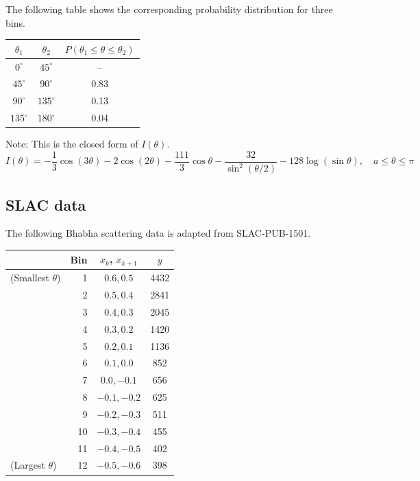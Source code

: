 \documentclass[12pt]{article}
\begin{document}
\noindent
The following table shows the corresponding probability distribution for three bins.

\begin{center}
\begin{tabular}{|c|c|c|}
\hline
$\theta_1$ & $\theta_2$ & $P(\theta_1\le\theta\le\theta_2)$\\
\hline
$0^\circ$ & $45^\circ$ & -- \\
$45^\circ$ & $90^\circ$ & 0.83 \\
$90^\circ$ & $135^\circ$ & 0.13 \\
$135^\circ$ & $180^\circ$ & 0.04 \\
\hline
\end{tabular}
\end{center}

\noindent
Note: This is the closed form of $I(\theta)$.
\begin{equation*}
I(\theta)=-\frac{1}{3}\cos(3\theta)
-2\cos(2\theta)
-\frac{111}{3}\cos\theta
-\frac{32}{\sin^2(\theta/2)}
-128\log(\sin\theta),
\quad a\le\theta\le\pi
\end{equation*}

\subsection*{SLAC data}
\noindent
The following Bhabha scattering data is adapted from SLAC-PUB-1501.

\begin{center}
\begin{tabular}{|lr|c|c|}
\hline
& Bin & $x_k$, $x_{k+1}$ & $y$\\
\hline
(Smallest $\theta$) & 1 & $0.6, 0.5$ & 4432\\
& 2 & $0.5, 0.4$ & 2841\\
& 3 & $0.4, 0.3$ & 2045\\
& 4 & $0.3, 0.2$ & 1420\\
& 5 & $0.2, 0.1$ & 1136\\
& 6 & $0.1, 0.0$ & 852\\
& 7 & $0.0, -0.1$ & 656\\
& 8 & $-0.1, -0.2$ & 625\\
& 9 & $-0.2, -0.3$ & 511\\
& 10 & $-0.3, -0.4$ & 455\\
& 11 & $-0.4, -0.5$ & 402\\
(Largest $\theta$) & 12 & $-0.5, -0.6$ & 398\\
\hline
\end{tabular}
\end{center}
\end{document}
